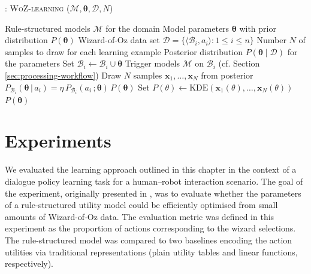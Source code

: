 \begin{algorithm}[h!]
\caption{: \textsc{WoZ-learning} ($\mathcal{M}, \boldsymbol\theta, \mathcal{D}, N$)}
\begin{algorithmic}[1] \vspace{1mm}
\REQUIRE Rule-structured models $\mathcal{M}$ for the domain
\REQUIRE Model parameters $\boldsymbol\theta$ with prior distribution $P(\boldsymbol\theta)$
\REQUIRE Wizard-of-Oz data set $\mathcal{D} = \{\langle \mathcal{B}_i, a_i \rangle : 1 \leq i  \leq n\}$
\REQUIRE Number $N$ of samples to draw for each learning example
\ENSURE Posterior distribution $P(\boldsymbol\theta \; | \; \mathcal{D})$ for the parameters  \vspace{1mm}
\STATE Set $\mathcal{B}_i \leftarrow \mathcal{B}_i \cup \boldsymbol\theta$
\STATE Trigger models $\mathcal{M}$ on $\mathcal{B}_i$ (cf. Section \ref{sec:processing-workflow})
\STATE Draw $N$ samples $\mathbf{x}_1, \dots, \mathbf{x}_N$ from posterior $P_{\mathcal{B}_i}(\boldsymbol\theta \, | \, a_i) = \eta \, P_{\mathcal{B}_i}(a_i\,; \boldsymbol\theta) \, P(\boldsymbol\theta )$
\STATE Set $P(\theta) \leftarrow \mathrm{KDE}(\mathbf{x}_1(\theta), \dots, \mathbf{x}_N(\theta))$
\ENDFOR
\ENDFOR
\RETURN $P(\boldsymbol\theta)$
\end{algorithmic}
\label{algo:wozlearning}
\end{algorithm}


\section{Experiments}
\label{sec:wozlearning-experiments}

We evaluated the learning approach outlined in this chapter in the context of a dialogue policy learning task for a human--robot interaction scenario.  The goal of the experiment, originally presented in \cite{rulebasedmodels-sigdial2012}, was to evaluate whether the parameters of a rule-structured utility model could be efficiently optimised from small amounts of Wizard-of-Oz data.  The evaluation metric was defined in this experiment as the proportion of actions corresponding to the wizard selections. The rule-structured model was compared to two baselines encoding the action utilities via traditional representations (plain utility tables and linear functions, respectively). 

